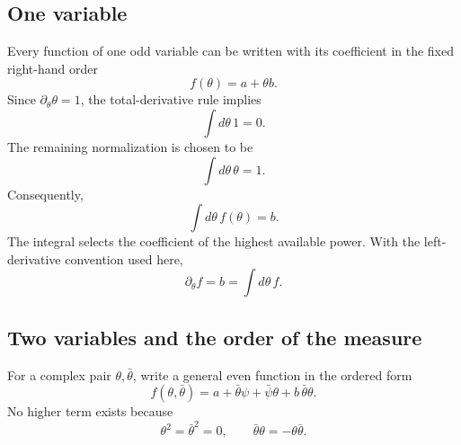 \subsection{One variable}

Every function of one odd variable can be written with its coefficient in the fixed right-hand order
\begin{equation}
f(\theta)=a+\theta b.
\end{equation}
Since \(\partial_\theta\theta=1\), the total-derivative rule implies
\begin{equation}
\int d\theta\,1=0.
\end{equation}
The remaining normalization is chosen to be
\begin{equation}
\int d\theta\,\theta=1.
\end{equation}
Consequently,
\begin{equation}
\int d\theta\,f(\theta)=b.
\end{equation}
The integral selects the coefficient of the highest available power. With the left-derivative convention used here,
\begin{equation}
\partial_\theta f=b
=\int d\theta\,f.
\end{equation}

\begin{classroomqa}
\end{classroomqa}

\subsection{Two variables and the order of the measure}

For a complex pair \(\theta,\bar\theta\), write a general even function in the ordered form
\begin{equation}
f(\theta,\bar\theta)
=a+\bar\theta\psi+\bar\psi\theta+b\,\bar\theta\theta.
\end{equation}
No higher term exists because
\begin{equation}
\theta^2=\bar\theta^2=0,
\qquad
\bar\theta\theta=-\theta\bar\theta.
\end{equation}

